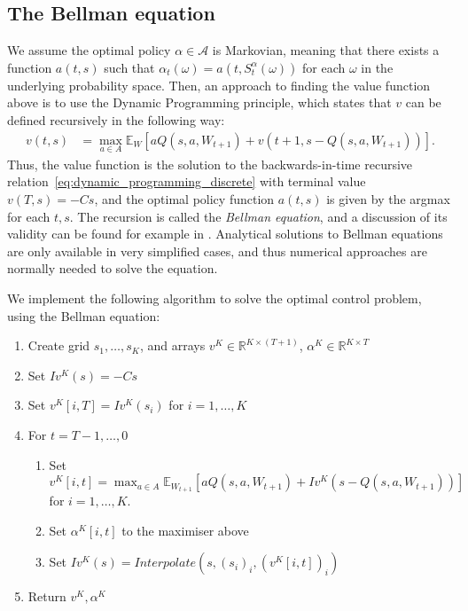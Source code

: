 \documentclass[main.tex]{subfiles}
\begin{document}
\subsection{The Bellman equation}
We assume the optimal policy $\alpha\in\mathcal A$ is Markovian,
meaning that
there exists a function $a(t,s)$ such that $\alpha_t(\omega) =
a(t,S_t^\alpha(\omega))$ for each $\omega$ in the underlying probability space.
Then,
an approach to finding the value function above is to use the Dynamic
Programming principle, which states that $v$ can be defined
recursively in the following way:
\begin{align}\label{eq:dynamic_programming_discrete}
  v(t,s)&=\max_{a\in A}\mathbb E_{W}\left[
          aQ(s,a,W_{t+1})
          +v(t+1,s-Q(s,a,W_{t+1}))\right].
\end{align}
Thus, the value function is the solution to the backwards-in-time
recursive relation~\eqref{eq:dynamic_programming_discrete} with
terminal value $v(T,s)=-Cs$, and the optimal policy
function $a(t,s)$ is given by the argmax for each $t,s$.
The recursion is called the \emph{Bellman equation}, and a discussion
of its validity can be found for example in
\citet{bertsekas2005dynamic}.
Analytical solutions to Bellman equations are only available in very
simplified cases, and thus numerical approaches are normally needed to
solve the equation.

We implement the following algorithm to solve the optimal control
problem, using the Bellman equation:
\begin{enumerate}
\item Create grid $s_1,\dots,s_K$, and arrays $v^K\in\mathbb R^{K\times(T+1)}$,
  $\alpha^K\in\mathbb R^{K\times T}$
\item Set $Iv^K(s)=-Cs$
\item Set $v^K[i,T]=Iv^K(s_i)$ for $i=1,\dots, K$
\item For $t = T-1,\dots,0$
  \begin{enumerate}
  \item Set $\displaystyle v^K[i,t]=\max_{a\in A}\mathbb E_{W_{t+1}}\left[ aQ(s,a,W_{t+1})
      +Iv^K(s-Q(s,a,W_{t+1}))\right]$\\ for $i=1,\dots,K$.
  \item Set $\alpha^K[i,t]$ to the maximiser above
  \item Set $Iv^K(s) = Interpolate(s, {(s_i)}_i,{(v^K[i,t])}_i)$
  \end{enumerate}
\item Return $v^K,\alpha^K$
\end{enumerate}
\end{document}
